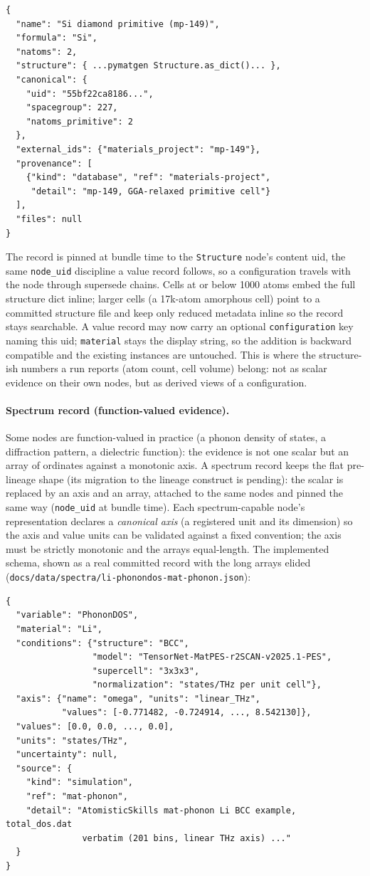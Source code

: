 \documentclass[11pt,a4paper]{article}
\begin{document}
\begin{verbatim}
{
  "name": "Si diamond primitive (mp-149)",
  "formula": "Si",
  "natoms": 2,
  "structure": { ...pymatgen Structure.as_dict()... },
  "canonical": {
    "uid": "55bf22ca8186...",
    "spacegroup": 227,
    "natoms_primitive": 2
  },
  "external_ids": {"materials_project": "mp-149"},
  "provenance": [
    {"kind": "database", "ref": "materials-project",
     "detail": "mp-149, GGA-relaxed primitive cell"}
  ],
  "files": null
}
\end{verbatim}

The record is pinned at bundle time to the \texttt{Structure} node's content uid,
the same \texttt{node\_uid} discipline a value record follows, so a configuration
travels with the node through supersede chains. Cells at or below 1000 atoms
embed the full structure dict inline; larger cells (a 17k-atom amorphous cell)
point to a committed structure file and keep only reduced metadata inline so the
record stays searchable. A value record may now carry an optional
\texttt{configuration} key naming this uid; \texttt{material} stays the display
string, so the addition is backward compatible and the existing instances are
untouched. This is where the structure-ish numbers a run reports (atom count,
cell volume) belong: not as scalar evidence on their own nodes, but as derived
views of a configuration.

\paragraph{Spectrum record (function-valued evidence).} Some nodes are
function-valued in practice (a phonon density of states, a diffraction pattern,
a dielectric function): the evidence is not one scalar but an array of ordinates
against a monotonic axis. A spectrum record keeps the flat pre-lineage shape
(its migration to the lineage construct is pending): the scalar is replaced by
an axis and an array, attached to the same nodes and pinned the same
way (\texttt{node\_uid} at bundle time). Each spectrum-capable node's
representation declares a \emph{canonical axis} (a registered unit and its
dimension) so the axis and value units can be validated against a fixed
convention; the axis must be strictly monotonic and the arrays equal-length.
The implemented schema, shown as a real committed record with the long arrays
elided
(\texttt{docs/data/spectra/li-phonondos-mat-phonon.json}):

\begin{verbatim}
{
  "variable": "PhononDOS",
  "material": "Li",
  "conditions": {"structure": "BCC",
                 "model": "TensorNet-MatPES-r2SCAN-v2025.1-PES",
                 "supercell": "3x3x3",
                 "normalization": "states/THz per unit cell"},
  "axis": {"name": "omega", "units": "linear_THz",
           "values": [-0.771482, -0.724914, ..., 8.542130]},
  "values": [0.0, 0.0, ..., 0.0],
  "units": "states/THz",
  "uncertainty": null,
  "source": {
    "kind": "simulation",
    "ref": "mat-phonon",
    "detail": "AtomisticSkills mat-phonon Li BCC example, total_dos.dat
               verbatim (201 bins, linear THz axis) ..."
  }
}
\end{verbatim}
\end{document}
